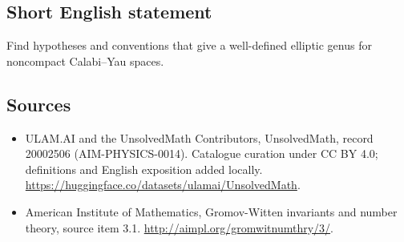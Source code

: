 \documentclass[11pt]{article}
\begin{document}
\subsection{Short English statement}
Find hypotheses and conventions that give a well-defined elliptic genus for noncompact Calabi–Yau spaces.
\subsection{Sources}
\begin{itemize}
\item[\hypertarget{source:20002506:1}{S1}] ULAM.AI and the UnsolvedMath Contributors, UnsolvedMath, record 20002506 (AIM-PHYSICS-0014). Catalogue curation under CC BY 4.0; definitions and English exposition added locally.
\url{https://huggingface.co/datasets/ulamai/UnsolvedMath}.
\item[\hypertarget{source:20002506:2}{S2}] American Institute of Mathematics, Gromov-Witten invariants and number theory, source item 3.1.
\url{http://aimpl.org/gromwitnumthry/3/}.
\end{itemize}
\label{end:20002506}
\end{document}
